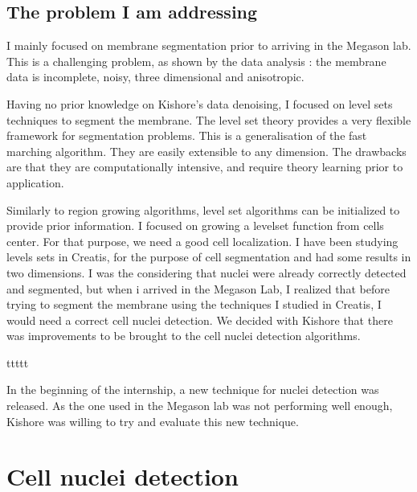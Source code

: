 \subsection{The problem I am addressing}

I mainly focused on membrane segmentation prior to arriving in the Megason lab. This is a challenging problem, as shown by the data analysis : the membrane data is incomplete, noisy, three dimensional and anisotropic.

Having no prior knowledge on Kishore's data denoising, I focused on level sets techniques to segment the membrane.
The level set theory provides a very flexible framework for segmentation problems.
This is a generalisation of the fast marching algorithm. They are easily extensible to any dimension.
The drawbacks are that they are computationally intensive, and require theory learning prior to application.

Similarly to region growing algorithms, level set algorithms can be initialized to provide prior information.
I focused on growing a levelset function from cells center. For that purpose, we need a good cell localization.
I have been studying levels sets in Creatis, for the purpose of cell segmentation and had some results in two dimensions.
I was the considering that nuclei were already correctly detected and segmented, but when i arrived in the Megason Lab, I realized that before trying to segment the membrane using the techniques I studied in Creatis, I would need a correct cell nuclei detection.
We decided with Kishore that there was improvements to be brought to the cell nuclei detection algorithms.
















\fergfzgrertge 






ttttt

In the beginning of the internship, a new technique for nuclei detection was released.
As the one used in the Megason lab was not performing well enough, Kishore was willing to try and evaluate this new technique.



%
%


\section{Cell nuclei detection}


